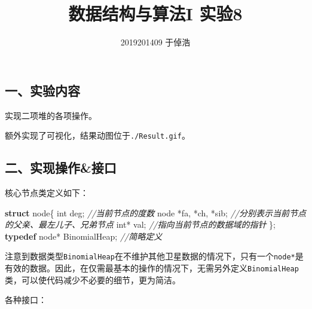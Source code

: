 \documentclass[]{article}
\title{数据结构与算法I 实验8}
\author{2019201409 于倬浩}
\newenvironment{Shaded}{}{}
\newcommand{\CommentTok}[1]{\textcolor[rgb]{0.38,0.63,0.69}{\textit{#1}}}
\newcommand{\DataTypeTok}[1]{\textcolor[rgb]{0.56,0.13,0.00}{#1}}
\newcommand{\KeywordTok}[1]{\textcolor[rgb]{0.00,0.44,0.13}{\textbf{#1}}}
\newcommand{\NormalTok}[1]{#1}
\begin{document}
\maketitle


\tableofcontents

\hypertarget{header-n4}{%
\subsection{一、实验内容}\label{header-n4}}

实现二项堆的各项操作。

额外实现了可视化，结果动图位于\texttt{./Result.gif}。

\hypertarget{header-n13}{%
\subsection{二、实现操作\&接口}\label{header-n13}}

核心节点类定义如下：

\begin{Shaded}
\begin{Highlighting}[]
\KeywordTok{struct}\NormalTok{ node\{}
    \DataTypeTok{int}\NormalTok{ deg;}
    \CommentTok{//当前节点的度数}
\NormalTok{    node *fa, *ch, *sib;}
    \CommentTok{//分别表示当前节点的父亲、最左儿子、兄弟节点}
    \DataTypeTok{int}\NormalTok{* val;}
    \CommentTok{//指向当前节点的数据域的指针}
\NormalTok{\};}
\KeywordTok{typedef}\NormalTok{ node* BinomialHeap; }\CommentTok{//简略定义}
\end{Highlighting}
\end{Shaded}

注意到数据类型\texttt{BinomialHeap}在不维护其他卫星数据的情况下，只有一个\texttt{node*}是有效的数据。因此，在仅需最基本的操作的情况下，无需另外定义\texttt{BinomialHeap}类，可以使代码减少不必要的细节，更为简洁。

各种接口：
\end{document}
